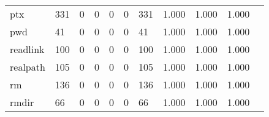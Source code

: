 \begin{longtable}{lp{1.2cm}p{1.2cm}p{1.2cm}p{1.2cm}p{1.2cm}p{1.2cm}p{1.2cm}p{1.2cm}p{1.2cm}p{1.2cm}}
ptx       &                                   331 &                                                  0 &                                                  0 &                                                  0 &                                                  0 &                                                331 &                                         1.000 &                                              1.000 &                                              1.000 \\
pwd       &                                    41 &                                                  0 &                                                  0 &                                                  0 &                                                  0 &                                                 41 &                                         1.000 &                                              1.000 &                                              1.000 \\
readlink  &                                   100 &                                                  0 &                                                  0 &                                                  0 &                                                  0 &                                                100 &                                         1.000 &                                              1.000 &                                              1.000 \\
realpath  &                                   105 &                                                  0 &                                                  0 &                                                  0 &                                                  0 &                                                105 &                                         1.000 &                                              1.000 &                                              1.000 \\
rm        &                                   136 &                                                  0 &                                                  0 &                                                  0 &                                                  0 &                                                136 &                                         1.000 &                                              1.000 &                                              1.000 \\
rmdir     &                                    66 &                                                  0 &                                                  0 &                                                  0 &                                                  0 &                                                 66 &                                         1.000 &                                              1.000 &                                              1.000 \\

\end{longtable}
